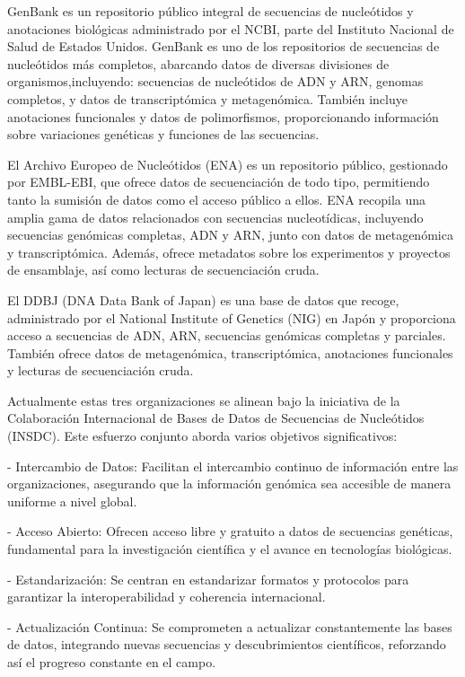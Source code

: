 GenBank es un repositorio público integral de secuencias de nucleótidos y anotaciones biológicas administrado por el NCBI, parte del Instituto Nacional de Salud de Estados Unidos. GenBank es uno de los repositorios de secuencias de nucleótidos más completos, abarcando datos de diversas divisiones de organismos,incluyendo: secuencias de nucleótidos de ADN y ARN, genomas completos, y datos de transcriptómica y metagenómica. También incluye anotaciones funcionales y datos de polimorfismos, proporcionando información sobre variaciones genéticas y funciones de las secuencias.


El Archivo Europeo de Nucleótidos (ENA) es un repositorio público, gestionado por EMBL-EBI, que ofrece datos de secuenciación de todo tipo, permitiendo tanto la sumisión de datos como el acceso público a ellos. ENA recopila una amplia gama de datos relacionados con secuencias nucleotídicas, incluyendo secuencias genómicas completas, ADN y ARN, junto con datos de metagenómica y transcriptómica. Además, ofrece metadatos sobre los experimentos y proyectos de ensamblaje, así como lecturas de secuenciación cruda. 


El DDBJ (DNA Data Bank of Japan) es una base de datos que recoge, administrado por el National Institute of Genetics (NIG) en Japón y proporciona acceso a secuencias de ADN, ARN, secuencias genómicas completas y parciales. También ofrece datos de metagenómica, transcriptómica, anotaciones funcionales y lecturas de secuenciación cruda.


Actualmente estas tres organizaciones se alinean bajo la iniciativa de la Colaboración Internacional de Bases de Datos de Secuencias de Nucleótidos (INSDC). Este esfuerzo conjunto aborda varios objetivos significativos:

- Intercambio de Datos: Facilitan el intercambio continuo de información entre las organizaciones, asegurando que la información genómica sea accesible de manera uniforme a nivel global.

- Acceso Abierto: Ofrecen acceso libre y gratuito a datos de secuencias genéticas, fundamental para la investigación científica y el avance en tecnologías biológicas.

- Estandarización: Se centran en estandarizar formatos y protocolos para garantizar la interoperabilidad y coherencia internacional.

- Actualización Continua: Se comprometen a actualizar constantemente las bases de datos, integrando nuevas secuencias y descubrimientos científicos, reforzando así el progreso constante en el campo.




